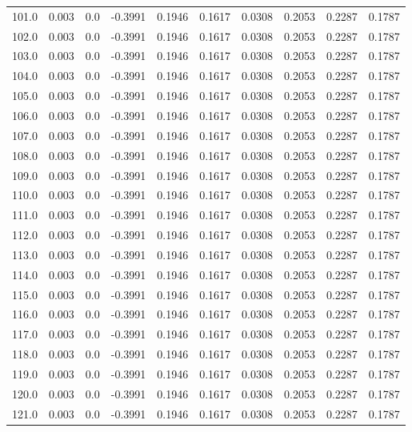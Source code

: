 \begin{longtable}{lrrrrrrrrr}
101.0 & 0.003 & 0.0 & -0.3991 & 0.1946 & 0.1617 & 0.0308 & 0.2053 & 0.2287 & 0.1787 \\
102.0 & 0.003 & 0.0 & -0.3991 & 0.1946 & 0.1617 & 0.0308 & 0.2053 & 0.2287 & 0.1787 \\
103.0 & 0.003 & 0.0 & -0.3991 & 0.1946 & 0.1617 & 0.0308 & 0.2053 & 0.2287 & 0.1787 \\
104.0 & 0.003 & 0.0 & -0.3991 & 0.1946 & 0.1617 & 0.0308 & 0.2053 & 0.2287 & 0.1787 \\
105.0 & 0.003 & 0.0 & -0.3991 & 0.1946 & 0.1617 & 0.0308 & 0.2053 & 0.2287 & 0.1787 \\
106.0 & 0.003 & 0.0 & -0.3991 & 0.1946 & 0.1617 & 0.0308 & 0.2053 & 0.2287 & 0.1787 \\
107.0 & 0.003 & 0.0 & -0.3991 & 0.1946 & 0.1617 & 0.0308 & 0.2053 & 0.2287 & 0.1787 \\
108.0 & 0.003 & 0.0 & -0.3991 & 0.1946 & 0.1617 & 0.0308 & 0.2053 & 0.2287 & 0.1787 \\
109.0 & 0.003 & 0.0 & -0.3991 & 0.1946 & 0.1617 & 0.0308 & 0.2053 & 0.2287 & 0.1787 \\
110.0 & 0.003 & 0.0 & -0.3991 & 0.1946 & 0.1617 & 0.0308 & 0.2053 & 0.2287 & 0.1787 \\
111.0 & 0.003 & 0.0 & -0.3991 & 0.1946 & 0.1617 & 0.0308 & 0.2053 & 0.2287 & 0.1787 \\
112.0 & 0.003 & 0.0 & -0.3991 & 0.1946 & 0.1617 & 0.0308 & 0.2053 & 0.2287 & 0.1787 \\
113.0 & 0.003 & 0.0 & -0.3991 & 0.1946 & 0.1617 & 0.0308 & 0.2053 & 0.2287 & 0.1787 \\
114.0 & 0.003 & 0.0 & -0.3991 & 0.1946 & 0.1617 & 0.0308 & 0.2053 & 0.2287 & 0.1787 \\
115.0 & 0.003 & 0.0 & -0.3991 & 0.1946 & 0.1617 & 0.0308 & 0.2053 & 0.2287 & 0.1787 \\
116.0 & 0.003 & 0.0 & -0.3991 & 0.1946 & 0.1617 & 0.0308 & 0.2053 & 0.2287 & 0.1787 \\
117.0 & 0.003 & 0.0 & -0.3991 & 0.1946 & 0.1617 & 0.0308 & 0.2053 & 0.2287 & 0.1787 \\
118.0 & 0.003 & 0.0 & -0.3991 & 0.1946 & 0.1617 & 0.0308 & 0.2053 & 0.2287 & 0.1787 \\
119.0 & 0.003 & 0.0 & -0.3991 & 0.1946 & 0.1617 & 0.0308 & 0.2053 & 0.2287 & 0.1787 \\
120.0 & 0.003 & 0.0 & -0.3991 & 0.1946 & 0.1617 & 0.0308 & 0.2053 & 0.2287 & 0.1787 \\
121.0 & 0.003 & 0.0 & -0.3991 & 0.1946 & 0.1617 & 0.0308 & 0.2053 & 0.2287 & 0.1787 \\

\end{longtable}
